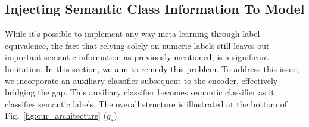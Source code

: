 \documentclass[letterpaper]{article} %
\newcommand{\nj}[1]{\textcolor{black}{#1}}
\newcommand{\jh}[1]{\textcolor{black}{#1}}
\newcommand{\yr}[1]{\textcolor{black}{#1}}
\newcommand{\ie}{\textit{i}.\textit{e}., }
\begin{document}



\subsection{Injecting Semantic Class Information To Model}
While it's possible to implement any-way meta-learning through label equivalence, \jh{the fact that} relying solely on numeric labels \jh{still} leaves out important semantic information \jh{as previously mentioned}, is a significant limitation. 
\jh{In this section, we aim to remedy this problem}. To address this issue, we incorporate an auxiliary classifier subsequent to the encoder, effectively bridging the gap.
This auxiliary classifier becomes semantic classifier as it classifies semantic labels.
The overall structure is illustrated at the bottom of Fig.~\ref{fig:our_architecture} ($g_s$).
\end{document}
